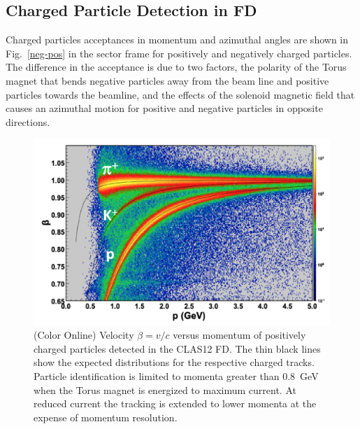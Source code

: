 \documentclass[final,3p,twocolumn]{elsarticle}
\begin{document}
\subsection{Charged Particle Detection in FD}
 
Charged particles acceptances in momentum and azimuthal angles are shown in Fig.~\ref{neg-pos} in the sector
frame for positively and negatively charged particles. The difference in the acceptance is due to two factors, the
polarity of the Torus magnet that bends negative particles away from the beam line and positive particles towards
the beamline, and the effects of the solenoid magnetic field that causes an azimuthal motion for positive and negative
particles in opposite directions. 

\begin{figure}[t!]
\centerline{\includegraphics[width=1.1\columnwidth]{FTOF1b_pid.png}}
\caption{(Color Online) Velocity $\beta = v/c $ versus momentum of positively charged particles detected in the CLAS12 FD. The
thin black lines show the expected distributions for the respective charged tracks. Particle identification is limited
to momenta greater than 0.8~GeV when the Torus magnet is energized to maximum current. At reduced current the
tracking is extended to lower momenta at the expense of momentum resolution.}
\label{pid}
\vspace{0.5cm}

\end{figure}
\end{document}
